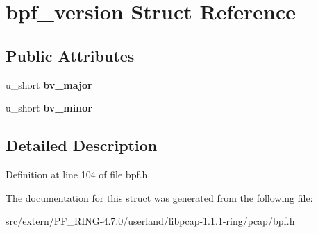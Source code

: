 \hypertarget{structbpf__version}{
\section{bpf\_\-version Struct Reference}
\label{structbpf__version}
}
\subsection*{Public Attributes}
\begin{DoxyCompactItemize}
\item 
\hypertarget{structbpf__version_a9c78af150c7d2c9a467a7131935229c6}{
u\_\-short {\bfseries bv\_\-major}}
\label{structbpf__version_a9c78af150c7d2c9a467a7131935229c6}

\item 
\hypertarget{structbpf__version_aa1f2d691777a23221d9d32a0e0a478ba}{
u\_\-short {\bfseries bv\_\-minor}}
\label{structbpf__version_aa1f2d691777a23221d9d32a0e0a478ba}

\end{DoxyCompactItemize}


\subsection{Detailed Description}


Definition at line 104 of file bpf.h.



The documentation for this struct was generated from the following file:\begin{DoxyCompactItemize}
\item 
src/extern/PF\_\-RING-\/4.7.0/userland/libpcap-\/1.1.1-\/ring/pcap/bpf.h\end{DoxyCompactItemize}
